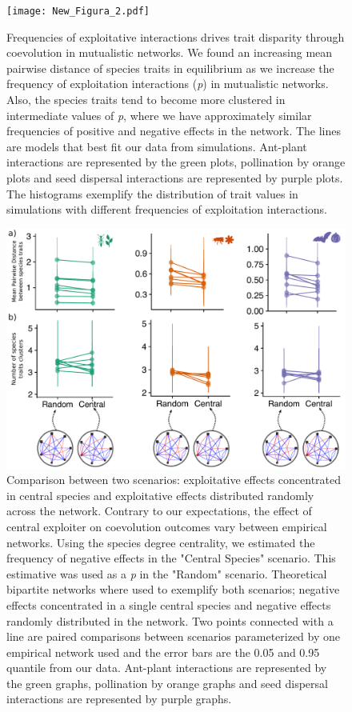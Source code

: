 \documentclass[a4paper, 12pt]{article}
\begin{document}
\begin{singlespace}
\begin{figure}[H]
  \texttt{[image: New\_Figura\_2.pdf]}
  \vspace*{-7mm}
  \caption{Frequencies of exploitative interactions drives trait disparity through coevolution in mutualistic networks. We found an increasing mean pairwise distance of species traits in equilibrium as we increase the frequency of exploitation interactions (\textit{p}) in mutualistic networks. Also, the species traits tend to become more clustered in intermediate values of \textit{p}, where we have approximately similar frequencies of positive and negative effects in the network. The lines are models that best fit our data from simulations. Ant-plant interactions are represented by the green plots, pollination by orange plots and seed dispersal interactions are represented by purple plots. The histograms exemplify the distribution of trait values in simulations with different frequencies of exploitation interactions.
}
  \label{fig:2}
\end{figure}

\begin{figure}[H]
  \includegraphics[width=\linewidth]{New_Figura_3.pdf}
  \vspace*{-7mm}
  \caption{Comparison between two scenarios: exploitative effects concentrated in central species and exploitative effects distributed randomly across the network. Contrary to our expectations, the effect of central exploiter on coevolution outcomes vary between empirical networks. Using the species degree centrality, we estimated the frequency of negative effects in the "Central Species" scenario. This estimative was used as a \textit{p} in the "Random" scenario. Theoretical bipartite networks where used to exemplify both scenarios; negative effects concentrated in a single central species and negative effects randomly distributed in the network. Two points connected with a line are paired comparisons between scenarios parameterized by one empirical network used and the error bars are the 0.05 and 0.95 quantile from our data. Ant-plant interactions are represented by the green graphs, pollination by orange graphs and seed dispersal interactions are represented by purple graphs.}
  \label{fig:3}
\end{figure}


\end{singlespace}
\end{document}
